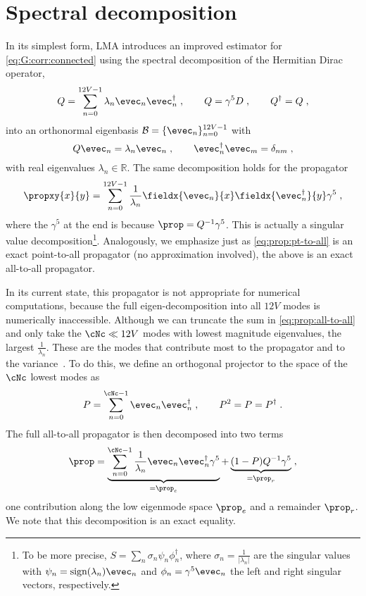 \section{Spectral decomposition}
\label{sec:lma:prop:decomp}

In its simplest form, LMA introduces an improved estimator for \cref{eq:G:corr:connected} using the spectral decomposition of the Hermitian Dirac operator,
\begin{equation}
Q = \sum_{n=0}^{12V-1} \lambda_{n} \evec_{n} \evec_{n}^{\dagger} \;,
\qquad
Q = \gamma^{5} D \;,
\qquad
Q^{\dagger} = Q \;,
\end{equation}
into an orthonormal eigenbasis $\mathcal{B} = \{ \evec_n \}_{n=0}^{12V-1}$ with
\begin{equation}
Q \evec_{n} = \lambda_{n} \evec_{n} \;,
\qquad
\evec_{n}^{\dagger} \evec_{m} = \delta_{nm} \;,
\end{equation}
with real eigenvalues $\lambda_{n} \in \mathbb{R}$.
The same decomposition holds for the propagator
\begin{equation} \label{eq:prop:all-to-all}
\propxy{x}{y} = \sum_{n=0}^{12V-1} \frac{1}{\lambda_{n}} \fieldx{\evec_{n}}{x} \fieldx{\evec_{n}^{\dagger}}{y} \gamma^{5} \;,
\end{equation}
where the $\gamma^{5}$ at the end is because $\prop = Q^{-1} \gamma^{5}$.
This is actually a singular value decomposition\footnote{To be more precise, $S = \sum_n \sigma_n \psi_{n} \phi_{n}^{\dagger}$, where $\sigma_n = \frac{1}{\lvert \lambda_{n} \rvert}$ are the singular values with $\psi_{n} = \text{sign}(\lambda_n) \evec_{n}$ and $\phi_{n} = \gamma^{5} \evec_{n}$ the left and right singular vectors, respectively.}.
Analogously, we emphasize just as \cref{eq:prop:pt-to-all} is an exact point-to-all propagator (no approximation involved), the above is an exact all-to-all propagator.

In its current state, this propagator is not appropriate for numerical computations, because the full eigen-decomposition into all $12V$ modes is numerically inaccessible.
Although we can truncate the sum in \cref{eq:prop:all-to-all} and only take the $\cNc \ll 12 V$ modes with lowest magnitude eigenvalues, \ie the largest $\frac{1}{\lambda_{n}}$.
These are the modes that contribute most to the propagator and to the variance~\cite{DeGrand_2004}.
To do this, we define an orthogonal projector to the space of the $\cNc$ lowest modes as
\begin{equation} \label{eq:lma:projector}
P = \sum_{n=0}^{\cNc-1} \evec_n \evec_n^{\dagger} \;,
\qquad
P^{2} = P = P^{\dagger} \;.
\end{equation}
The full all-to-all propagator is then decomposed into two terms
\begin{equation} \label{eq:prop:lma}
\prop
= \underbrace{\sum_{n=0}^{\cNc-1}
  \frac{1}{\lambda_{n}} \evec_{n} \evec_{n}^{\dagger} \gamma^{5}}_{=\prop_e}
+ \underbrace{(1-P) Q^{-1} \gamma^{5}}_{=\prop_r} \;,
\end{equation}
one contribution along the low eigenmode space $\prop_e$ and a remainder $\prop_r$.
We note that this decomposition is an exact equality.

